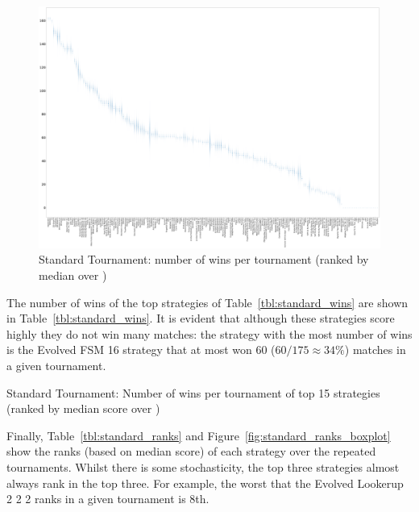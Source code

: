 \documentclass{article}
\begin{document}
\begin{landscape}
    \begin{figure}[!hbtp]
        \centering
        \includegraphics[width=\paperwidth]{./assets/standard_wins_boxplots.pdf}
        \caption{Standard Tournament: number of wins per tournament (ranked by
        median over
        \protecttournaments)}
        \label{fig:standard_winplot}
    \end{figure}
\end{landscape}

The number of wins of the top strategies of Table~\ref{tbl:standard_wins} are
shown in Table~\ref{tbl:standard_wins}. It is evident that although these
strategies score highly they do not win many matches: the strategy with the most
number of wins is the Evolved FSM 16 strategy that at most won 60
(\(60/175\approx34\%\)) matches in a given tournament.

\begin{table}[!hbtp]
    \centering
        
        \caption{Standard Tournament: Number of wins per tournament
        of top 15 strategies (ranked by median score over
        \protecttournaments)}
        \label{tbl:standard_wins}
\end{table}


Finally, Table~\ref{tbl:standard_ranks} and
Figure~\ref{fig:standard_ranks_boxplot} show the ranks (based on median score)
of each strategy over the repeated tournaments. Whilst there is some
stochasticity, the top three strategies almost always rank in the top three. For
example, the worst that the Evolved Lookerup 2 2 2 ranks in a given tournament
is 8th.
\end{document}
